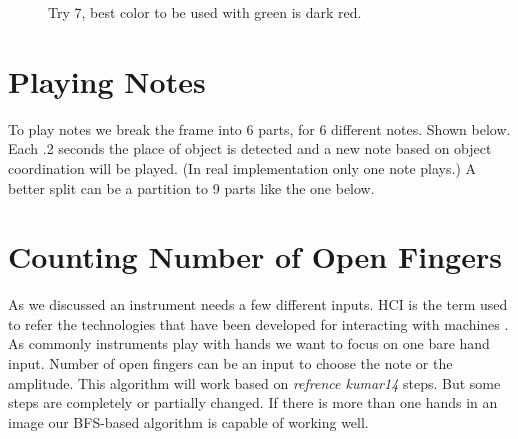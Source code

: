 \documentclass{report}
\begin{document}
\begin{figure}
\caption{Try 7, best color to be used with green is dark red.}
\end{figure}
	

\section{Playing Notes}
To play notes we break the frame into 6 parts, for 6 different notes. Shown below. Each .2 seconds the place of object is detected and a new note based on object coordination will be played. (In real implementation only one note plays.) A better split can be a partition to 9 parts like the one below.

\section{Counting Number of Open Fingers}
As we discussed an instrument needs a few different inputs. HCI
is the term used to refer the technologies that have been developed for interacting with machines \cite{dey2014algorithm}. As commonly instruments play with hands we want to focus on one bare hand input. Number of open fingers can be an input to choose the note or the amplitude. This algorithm will work based on \textit{refrence kumar14} steps. But some steps are completely or partially changed. If there is more than one hands in an image our BFS-based algorithm is capable of working well.
\end{document}
